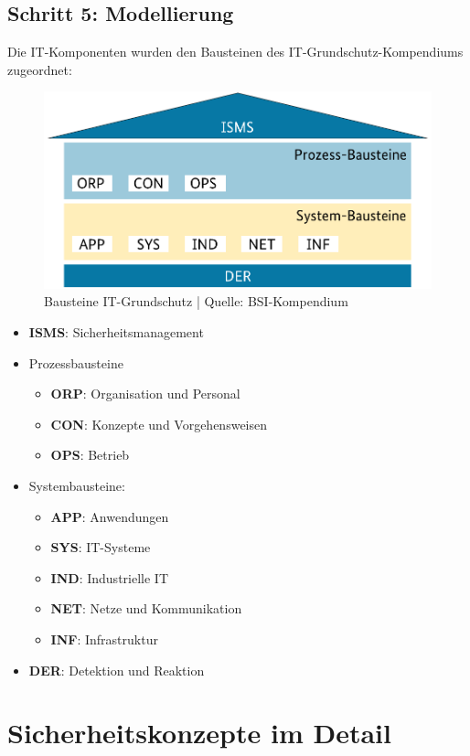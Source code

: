 \documentclass{orgstandard}
\begin{document}
\subsection{Schritt 5: Modellierung}
\label{sec:org4a39a26}
Die IT-Komponenten wurden den Bausteinen des IT-Grundschutz-Kompendiums zugeordnet:
\begin{figure}[!htpb]
\centering
\includegraphics[width=.65\linewidth]{img/IT-Komponenen.png}
\caption{Bausteine IT-Grundschutz | Quelle: BSI-Kompendium}
\end{figure}
\begin{NOTES}
\begin{itemize}
\item \textbf{ISMS}: Sicherheitsmanagement
\item Prozessbausteine
\begin{itemize}
\item \textbf{ORP}: Organisation und Personal
\item \textbf{CON}: Konzepte und Vorgehensweisen
\item \textbf{OPS}: Betrieb
\end{itemize}
\item Systembausteine:
\begin{itemize}
\item \textbf{APP}: Anwendungen
\item \textbf{SYS}: IT-Systeme
\item \textbf{IND}: Industrielle IT
\item \textbf{NET}: Netze und Kommunikation
\item \textbf{INF}: Infrastruktur
\end{itemize}
\item \textbf{DER}: Detektion und Reaktion
\end{itemize}
\end{NOTES}

\section{Sicherheitskonzepte im Detail}
\label{sec:org690d38d}
\end{document}
